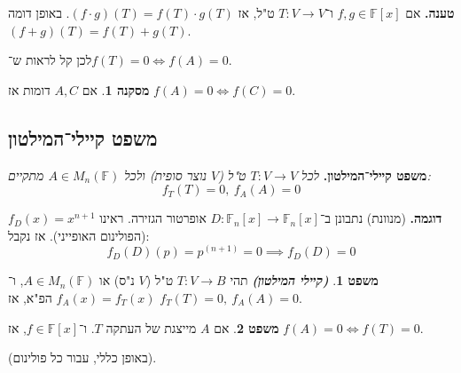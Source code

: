 \documentclass[a4paper]{article}
\newcommand\F         {\mathbb{F}}
\newcommand\co        {\colon}
\theoremstyle{definition}
\newtheorem{Theorem}{משפט}
\newtheorem{Collary}{מסקנה}
\newcommand\cola [1] {\begin{Collary}#1\end{Collary}}
\newcommand\theo  [1] {\begin{Theorem}#1\end{Theorem}}
\begin{document}
	\textbf{טענה. }אם $f, g \in \F[x]$ ו־$T \co V \to V$ ט"ל, אז $(f \cdot g)(T) = f(T) \cdot g(T)$. באופן דומה $(f + g)(T) = f(T) + g(T)$. 
	
	לכן קל לראות ש־$f(T) = 0 \iff f(A) = 0$. 
	
	\cola{אם $A, C$ דומות אז $f(A) = 0 \iff f(C) = 0$. }
	
	\subsection{משפט קיילי־המילטון}
	\textbf{משפט קיילי־המילטון. }\textit{לכל $T\co V \to V$ ט"ל ($V$ נוצר סופית) ולכל $A \in M_n(\F)$ מתקיים: 
		\[ f_T(T) = 0, \ f_A(A) = 0 \]}
	
	\textbf{דוגמה. }(מנוונת) נתבונן ב־$D \co \F_n[x] \to \F_n[x]$ אופרטור הגזירה. ראינו $f_D(x) = x^{n + 1}$ (הפולינום האופייני). אז נקבל: 
	\[ f_D(D)(p) = p^{(n + 1)} = 0 \implies f_D(D) = 0 \]
	
	\begin{Theorem}
		\textbf{\textit{(קיילי המילטון)}} תהי $T \co V \to B$ ט"ל ($V$ נ"ס) או $A \in M_n(\F)$, ו־$f_A(x) = f_T(x)$ הפ"א, אז $f_T(T) = 0, \ f_A(A) = 0$. 
	\end{Theorem}
	\theo{אם $A$ מייצגת של העתקה $T$. ו־$f \in \F[x]$, אז $f(A) = 0 \iff f(T) = 0$. }
	(באופן כללי, עבור כל פולינום). 
	
\end{document}
